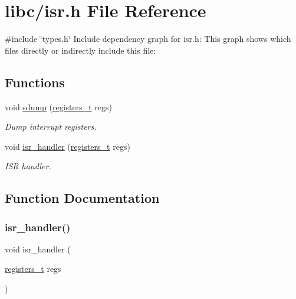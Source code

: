 \hypertarget{a00116}{}\section{libc/isr.h File Reference}
\label{a00116}
{\ttfamily \#include \char`\"{}types.\+h\char`\"{}}\newline
Include dependency graph for isr.\+h\+:
This graph shows which files directly or indirectly include this file\+:
\subsection*{Functions}
\begin{DoxyCompactItemize}
\item 
void \hyperlink{a00116_a4b4233daef6e041e7278cae2b21b5ed4_a4b4233daef6e041e7278cae2b21b5ed4}{sdump} (\hyperlink{a00140_adf58dbaf6139b4957c348711f2026957_adf58dbaf6139b4957c348711f2026957}{registers\+\_\+t} regs)
\begin{DoxyCompactList}\small\item\em Dump interrupt registers. \end{DoxyCompactList}\item 
void \hyperlink{a00116_a700e3ca056bf69296370f504f2cb6cc8_a700e3ca056bf69296370f504f2cb6cc8}{isr\+\_\+handler} (\hyperlink{a00140_adf58dbaf6139b4957c348711f2026957_adf58dbaf6139b4957c348711f2026957}{registers\+\_\+t} regs)
\begin{DoxyCompactList}\small\item\em I\+SR handler. \end{DoxyCompactList}\end{DoxyCompactItemize}


\subsection{Function Documentation}
\mbox{\label{a00116_a700e3ca056bf69296370f504f2cb6cc8_a700e3ca056bf69296370f504f2cb6cc8}} 
\subsubsection{\texorpdfstring{isr\+\_\+handler()}{isr\_handler()}}
{\footnotesize\ttfamily void isr\+\_\+handler (\begin{DoxyParamCaption}\item[{\hyperlink{a00140_adf58dbaf6139b4957c348711f2026957_adf58dbaf6139b4957c348711f2026957}{registers\+\_\+t}}]{regs }\end{DoxyParamCaption})}




